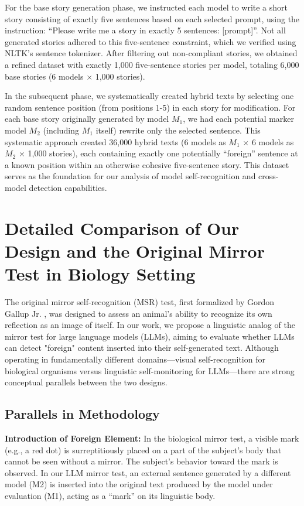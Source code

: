 \documentclass{article}
\begin{document}
For the base story generation phase, we instructed each model to write a short story consisting of exactly five sentences based on each selected prompt, using the instruction: ``Please write me a story in exactly 5 sentences: [prompt]''. Not all generated stories adhered to this five-sentence constraint, which we verified using NLTK's sentence tokenizer. After filtering out non-compliant stories, we obtained a refined dataset with exactly 1,000 five-sentence stories per model, totaling 6,000 base stories (6 models $\times$ 1,000 stories).

In the subsequent phase, we systematically created hybrid texts by selecting one random sentence position (from positions 1-5) in each story for modification. For each base story originally generated by model $M_1$, we had each potential marker model $M_2$ (including $M_1$ itself) rewrite only the selected sentence. This systematic approach created 36,000 hybrid texts (6 models as $M_1$ $\times$ 6 models as $M_2$ $\times$ 1,000 stories), each containing exactly one potentially ``foreign'' sentence at a known position within an otherwise cohesive five-sentence story. This dataset serves as the foundation for our analysis of model self-recognition and cross-model detection capabilities.



\section{Detailed Comparison of Our Design and the Original Mirror Test in Biology Setting}

The original mirror self-recognition (MSR) test, first formalized by Gordon Gallup Jr. \citep{gallup1970chimpanzees}, was designed to assess an animal’s ability to recognize its own reflection as an image of itself. In our work, we propose a linguistic analog of the mirror test for large language models (LLMs), aiming to evaluate whether LLMs can detect "foreign" content inserted into their self-generated text. Although operating in fundamentally different domains—visual self-recognition for biological organisms versus linguistic self-monitoring for LLMs—there are strong conceptual parallels between the two designs.

\subsection{Parallels in Methodology}

\textbf{Introduction of Foreign Element:}  
In the biological mirror test, a visible mark (e.g., a red dot) is surreptitiously placed on a part of the subject’s body that cannot be seen without a mirror. The subject’s behavior toward the mark is observed. In our LLM mirror test, an external sentence generated by a different model (M2) is inserted into the original text produced by the model under evaluation (M1), acting as a “mark” on its linguistic body.
\end{document}
